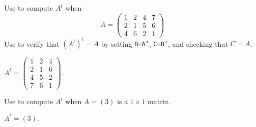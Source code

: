 \documentclass{ximera}
\begin{document}
\CEXER

\begin{exercise} \label{c1.3.5a}
Use \Matlab to compute $A^t$ when
\begin{equation} 
A = \left(\begin{array}{cccc} 
1 & 2 & 4 & 7 \\ 2 & 1 & 5 & 6 \\  4 & 6 & 2 & 1 
\end{array}\right)
\end{equation}
Use \Matlab to verify that $(A^t)^t=A$ by setting {\tt B=A'}, {\tt C=B'},
and checking that $C=A$.

\begin{solution}
\ans $A^t =
\left(\begin{array}{rrr}
1 & 2 & 4 \\
2 & 1 & 6 \\
4 & 5 & 2 \\
7 & 6 & 1
\end{array}\right).$

\end{solution}
\end{exercise}

\begin{exercise} \label{c1.3.5b}
Use \Matlab to compute $A^t$ when $A=(3)$ is a $1\times 1$ matrix.

\begin{solution}
\ans $A^t = (3).$




\end{solution}
\end{exercise}
\end{document}
